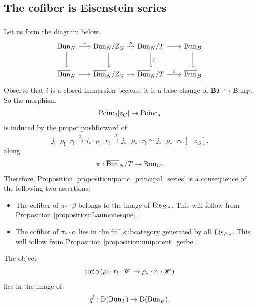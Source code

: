 \subsection{The cofiber is Eisenstein series}

\subsubsection{} Let us form the diagram below.
\[
\begin{tikzcd}[
  column sep={6em,between origins},
  row sep={4em,between origins}
]
  \Bun_N \arrow[r, "r"] \arrow[d] & \Bun_N / Z_G \arrow[r, "\rho"] \arrow[d] & \Bun_N / T \arrow[r] \arrow[d, "j"] & \Bun_B \arrow[d]  \\
  \Bunc_N \arrow[r] & \Bunc_N / Z_G \arrow[r] & \Bunc_N / T \arrow[r, "i"] & \Bunc_B
\end{tikzcd}
\]
Observe that $i$ is a closed immersion because it is a base change of $\mathbf{B} T \hookrightarrow \mathrm{Bun}_T$. So the morphism
    \[\mathrm{Poinc}_! [z_G] \to \mathrm{Poinc}_*\]
is induced by the proper pushforward of
    \[
    j_! \cdot \rho_! \cdot r_!
    \overset{\alpha}{\longrightarrow} j_* \cdot \rho_! \cdot r_!
    \overset{\beta}{\longrightarrow} j_* \cdot \rho_* \cdot r_!
    \simeq j_* \cdot \rho_* \cdot r_* \, [-z_G].
    \]
along
    \[\pi : \overline{\mathrm{Bun}}_N/T \to \mathrm{Bun}_G.\]
Therefore, Proposition \ref{proposition:poinc_principal_series} is a consequence of the following two assertions:
\begin{itemize}
    \item The cofiber of $\pi_* \cdot \beta$ belongs to the image of $\mathrm{Eis}_{B,*}$. This will follow from Proposition \ref{proposition:Laumonesque}.
    \item The cofiber of $\pi_* \cdot \alpha$ lies in the full subcategory generated by all $\mathrm{Eis}_{P,*}$. This will follow from Proposition \ref{proposition:unipotent_gerbe}.
\end{itemize}

\begin{proposition}
\label{proposition:Laumonesque}
The object
  \[
  \mathrm{cofib}\left( \rho_! \cdot r_! \cdot \mathscr{W} \to \rho_* \cdot r_! \cdot \mathscr{W} \right)
  \]
lies in the image of
  \[q^! : \mathrm{D}(\mathrm{Bun}_T) \to \mathrm{D}(\mathrm{Bun}_B).\]
\end{proposition}

